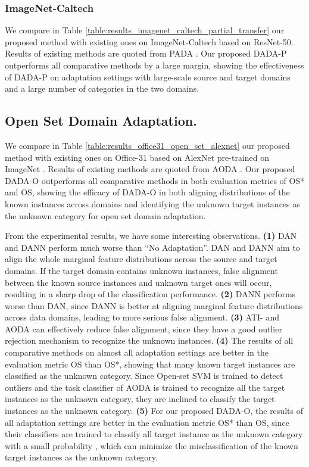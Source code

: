 \documentclass[letterpaper]{article} \usepackage{aaai20}  \usepackage{times}  \usepackage{helvet} \usepackage{courier}  \usepackage[hyphens]{url}  \usepackage{graphicx} \urlstyle{rm} \def\UrlFont{\rm}  \usepackage{graphicx}  \frenchspacing  \setlength{\pdfpagewidth}{8.5in}  \setlength{\pdfpageheight}{11in}
\begin{document}
\subsubsection{ImageNet-Caltech}
We compare in Table \ref{table:results_imagenet_caltech_partial_transfer} our proposed method with existing ones on ImageNet-Caltech based on ResNet-50. Results of existing methods are quoted from PADA \cite{pada}. Our proposed DADA-P outperforms all comparative methods by a large margin, showing the effectiveness of DADA-P on adaptation settings with large-scale source and target domains and a large number of categories in the two domains. 

\subsection{Open Set Domain Adaptation. }We compare in Table \ref{table:results_office31_open_set_alexnet} our proposed method with existing ones on Office-31 based on AlexNet \cite{alexnet} pre-trained on ImageNet \cite{imagenet}. Results of existing methods are quoted from AODA \cite{bp_for_os}. Our proposed DADA-O outperforms all comparative methods in both evaluation metrics of OS* and OS, showing the efficacy of DADA-O in both aligning distributions of the known instances across domains and identifying the unknown target instances as the unknown category for open set domain adaptation. 

From the experimental results, we have some interesting observations. \textbf{(1)} DAN and DANN perform much worse than ``No Adaptation''. DAN and DANN aim to align the whole marginal feature distributions across the source and target domains. If the target domain contains unknown instances, false alignment between the known source instances and unknown target ones will occur, resulting in a sharp drop of the classification performance. \textbf{(2)} DANN performs worse than DAN, since DANN is better at aligning marginal feature distributions across data domains, leading to more serious false alignment. \textbf{(3)} ATI- and AODA can effectively reduce false alignment, since they have a good outlier rejection mechanism to recognize the unknown instances. \textbf{(4)} The results of all comparative methods on almost all adaptation settings are better in the evaluation metric OS than OS*, showing that many known target instances are classified as the unknown category. Since Open-set SVM is trained to detect outliers and the task classifier of AODA is trained to recognize all the target instances as the unknown category, they are inclined to classify the target instances as the unknown category. \textbf{(5)} For our proposed DADA-O, the results of all adaptation settings are better in the evaluation metric OS* than OS, since their classifiers are trained to classify all target instance as the unknown category with a small probability , which can minimize the misclassification of the known target instances as the unknown category.
\end{document}
